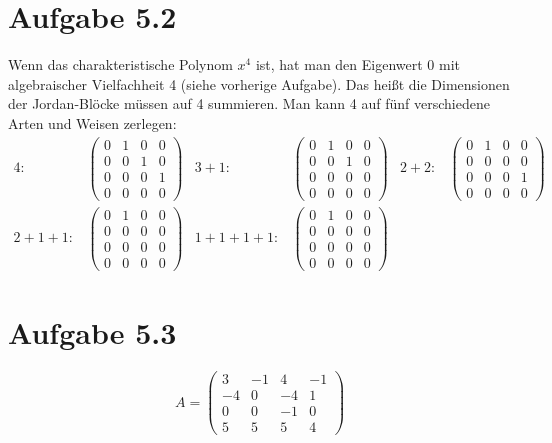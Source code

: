\documentclass{article} %
\begin{document}
\section{Aufgabe 5.2}
Wenn das charakteristische Polynom $x^4$ ist, hat man den Eigenwert $0$ mit algebraischer Vielfachheit 4 (siehe vorherige Aufgabe). Das heißt die Dimensionen der Jordan-Blöcke müssen auf 4 summieren. 
Man kann 4 auf fünf verschiedene Arten und Weisen zerlegen: 
\begin{align*}
    4:& \begin{pmatrix}
    0&1&0&0\\
    0&0&1&0\\
    0&0&0&1\\
    0&0&0&0
    \end{pmatrix} &
    3+1:& \begin{pmatrix}
    0&1&0&0\\
    0&0&1&0\\
    0&0&0&0\\
    0&0&0&0
    \end{pmatrix} &
    2+2:& \begin{pmatrix}
    0&1&0&0\\
    0&0&0&0\\
    0&0&0&1\\
    0&0&0&0
    \end{pmatrix} \\
     2+1+1:& \begin{pmatrix}
    0&1&0&0\\
    0&0&0&0\\
    0&0&0&0\\
    0&0&0&0
    \end{pmatrix} &
     1+1+1+1:& \begin{pmatrix}
    0&1&0&0\\
    0&0&0&0\\
    0&0&0&0\\
    0&0&0&0
    \end{pmatrix}
\end{align*}

\section{Aufgabe 5.3}
\[
A = \begin{pmatrix}
3 & -1 & 4 & -1 \\
-4 & 0 & -4 & 1 \\
0 & 0 & -1 & 0 \\
5 & 5 & 5 & 4
\end{pmatrix}
\]
\end{document}

